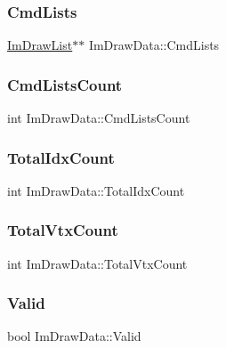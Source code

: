 \subsubsection{\texorpdfstring{Cmd\+Lists}{CmdLists}}
{\footnotesize\ttfamily \hyperlink{struct_im_draw_list}{Im\+Draw\+List}$\ast$$\ast$ Im\+Draw\+Data\+::\+Cmd\+Lists}

\hypertarget{struct_im_draw_data_adc0bbc2881c15f78bdabe51d82582f4e}{}\label{struct_im_draw_data_adc0bbc2881c15f78bdabe51d82582f4e} 
\subsubsection{\texorpdfstring{Cmd\+Lists\+Count}{CmdListsCount}}
{\footnotesize\ttfamily int Im\+Draw\+Data\+::\+Cmd\+Lists\+Count}

\hypertarget{struct_im_draw_data_a1ac8a5d441f464628295ef91a0602fc5}{}\label{struct_im_draw_data_a1ac8a5d441f464628295ef91a0602fc5} 
\subsubsection{\texorpdfstring{Total\+Idx\+Count}{TotalIdxCount}}
{\footnotesize\ttfamily int Im\+Draw\+Data\+::\+Total\+Idx\+Count}

\hypertarget{struct_im_draw_data_af0035b52cdf91932b25eaf2da853965a}{}\label{struct_im_draw_data_af0035b52cdf91932b25eaf2da853965a} 
\subsubsection{\texorpdfstring{Total\+Vtx\+Count}{TotalVtxCount}}
{\footnotesize\ttfamily int Im\+Draw\+Data\+::\+Total\+Vtx\+Count}

\hypertarget{struct_im_draw_data_ad01ab9ce5e8843b7860ccbb3eb9a6554}{}\label{struct_im_draw_data_ad01ab9ce5e8843b7860ccbb3eb9a6554} 
\subsubsection{\texorpdfstring{Valid}{Valid}}
{\footnotesize\ttfamily bool Im\+Draw\+Data\+::\+Valid}


